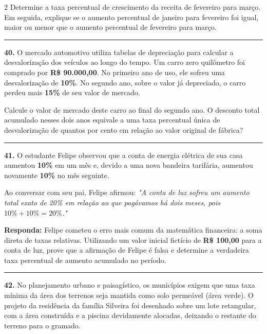 \documentclass[twoside, 10pt, a4paper]{article}
\newlength{\espacoPreQuestao}
\newlength{\espacoQuestao}
\begin{document}
\begin{multicols*}{2}
Determine a taxa percentual de crescimento da receita de fevereiro para março. Em seguida, explique se o aumento percentual de janeiro para fevereiro foi igual, maior ou menor que o aumento percentual de fevereiro para março.
\par\vspace{\espacoQuestao}

\noindent\textcolor{CorLinha}{\rule{\linewidth}{0.5pt}} 
\par\vspace{\espacoPreQuestao}
\textbf{40.} O mercado automotivo utiliza tabelas de depreciação para calcular a desvalorização dos veículos ao longo do tempo. Um carro zero quilômetro foi comprado por \textbf{R\$ 90.000,00}. No primeiro ano de uso, ele sofreu uma desvalorização de \textbf{10\%}. No segundo ano, sobre o valor já depreciado, o carro perdeu mais \textbf{15\%} de seu valor de mercado.

Calcule o valor de mercado deste carro ao final do segundo ano. O desconto total acumulado nesses dois anos equivale a uma taxa percentual única de desvalorização de quantos por cento em relação ao valor original de fábrica?
\par\vspace{\espacoQuestao}

\noindent\textcolor{CorLinha}{\rule{\linewidth}{0.5pt}} 
\par\vspace{\espacoPreQuestao}
\textbf{41.} O estudante Felipe observou que a conta de energia elétrica de sua casa aumentou \textbf{10\%} em um mês e, devido a uma nova bandeira tarifária, aumentou novamente \textbf{10\%} no mês seguinte. 

Ao conversar com seu pai, Felipe afirmou: \textit{"A conta de luz sofreu um aumento total exato de 20\% em relação ao que pagávamos há dois meses, pois $ 10\% + 10\% = 20\% $."}
\begin{boxresponda}
\textbf{Responda:} Felipe cometeu o erro mais comum da matemática financeira: a soma direta de taxas relativas. Utilizando um valor inicial fictício de \textbf{R\$ 100,00} para a conta de luz, prove que a afirmação de Felipe é falsa e determine a verdadeira taxa percentual de aumento acumulado no período.
\end{boxresponda}
\par\vspace{\espacoQuestao}

\noindent\textcolor{CorLinha}{\rule{\linewidth}{0.5pt}} 
\par\vspace{\espacoPreQuestao}
\textbf{42.} No planejamento urbano e paisagístico, os municípios exigem que uma taxa mínima da área dos terrenos seja mantida como solo permeável (área verde). O projeto da residência da família Silveira foi desenhado sobre um lote retangular, com a área construída e a piscina devidamente alocadas, deixando o restante do terreno para o gramado.


\end{multicols*}
\end{document}

